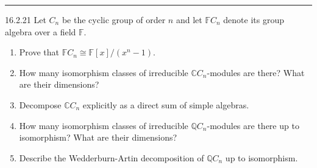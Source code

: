 \documentclass[a4paper, 12pt]{article}
\begin{document}
\noindent\rule{7in}{2.8pt}
\begin{problem}{16.2.21}
Let \(C_n\) be the cyclic group of order \(n\) and let \(\mathbb{F}C_n\) denote its group algebra over a field \(\mathbb{F}\).
\begin{enumerate}[(1)]
\item Prove that \(\mathbb{F}C_n\cong \mathbb{F}[x]/(x^n-1)\). 
\item How many isomorphism classes of irreducible \(\mathbb{C}C_n\)-modules are there? What are their dimensions? 
\item Decompose \(\mathbb{C}C_n\) explicitly as a direct sum of simple algebras. 
\item How many isomorphism classes of irreducible \(\mathbb{Q}C_n\)-modules are there up to isomorphism? What are their dimensions? 
\item Describe the Wedderburn-Artin decomposition of \(\mathbb{Q}C_n\) up to isomorphism.
\end{enumerate}
\end{problem}
\end{document}
